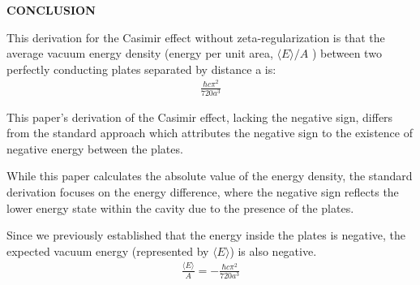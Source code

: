 \noindent\textbf{CONCLUSION}


This derivation for the Casimir effect without zeta-regularization is that the average vacuum energy density 
(energy per unit area, \(\langle E \rangle/A\) ) between two perfectly conducting plates separated by distance a is:
\begin{align}\frac{\hbar c \pi^2}{720 a^3}\end{align}

This paper's derivation of the Casimir effect, lacking the negative sign,  
differs from the standard approach which attributes the negative sign to the existence of negative energy between the plates. 

While this paper calculates the absolute value of the energy density, the standard derivation focuses on the energy difference, 
where the negative sign reflects the lower energy state within the cavity due to the presence of the plates.

Since we previously established that the energy inside the plates is negative, 
the expected vacuum energy (represented by $\langle E \rangle$) is also negative.
\begin{align}
    \frac{\langle E \rangle}{A} = -\frac{\hbar c \pi^2}{720 a^3}
\end{align}\\
